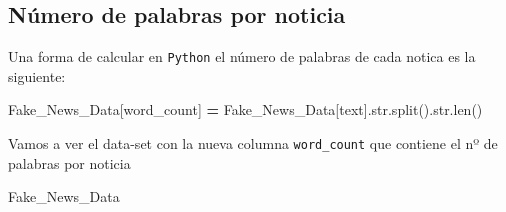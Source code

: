 \documentclass[
  11pt,
  a4paper,
]{article}
\newenvironment{Shaded}{\begin{snugshade}}{\end{snugshade}}
\newcommand{\BuiltInTok}[1]{#1}
\newcommand{\NormalTok}[1]{#1}
\newcommand{\OperatorTok}[1]{\textcolor[rgb]{0.81,0.36,0.00}{\textbf{#1}}}
\newcommand{\StringTok}[1]{\textcolor[rgb]{0.31,0.60,0.02}{#1}}
\begin{document}
\hypertarget{nuxfamero-de-palabras-por-noticia}{%
\subsection{Número de palabras por
noticia}\label{nuxfamero-de-palabras-por-noticia}}

Una forma de calcular en \texttt{Python} el número de palabras de cada
notica es la siguiente:

\begin{Shaded}
\begin{Highlighting}[]
\NormalTok{Fake\_News\_Data[}\StringTok{\textquotesingle{}word\_count\textquotesingle{}}\NormalTok{] }\OperatorTok{=}\NormalTok{ Fake\_News\_Data[}\StringTok{\textquotesingle{}text\textquotesingle{}}\NormalTok{].}\BuiltInTok{str}\NormalTok{.split().}\BuiltInTok{str}\NormalTok{.}\BuiltInTok{len}\NormalTok{()}
\end{Highlighting}
\end{Shaded}

Vamos a ver el data-set con la nueva columna \texttt{word\_count} que
contiene el nº de palabras por noticia

\begin{Shaded}
\begin{Highlighting}[]
\NormalTok{Fake\_News\_Data}
\end{Highlighting}
\end{Shaded}
\end{document}
